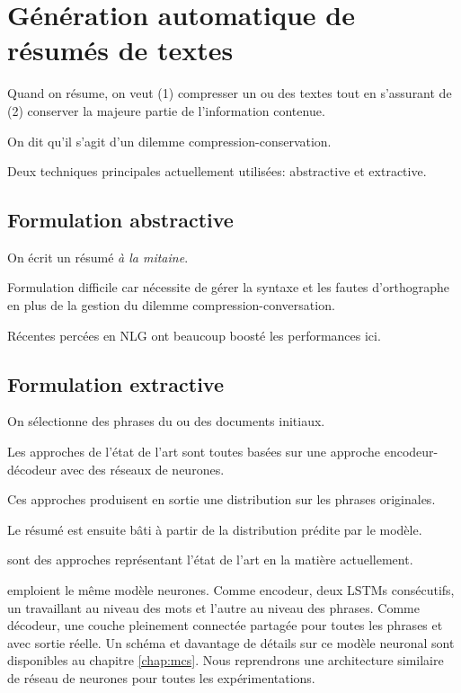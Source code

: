 \chapter{Génération automatique de résumés de textes}     %
\label{chap:generation_resumes}                           %

Quand on résume, on veut (1) compresser un ou des textes tout en
s'assurant de (2) conserver la majeure partie de l'information contenue.

On dit qu'il s'agit d'un dilemme compression-conservation.

Deux techniques principales actuellement utilisées: abstractive et extractive.

\section{Formulation abstractive}

On écrit un résumé \textit{à la mitaine}.

Formulation difficile car nécessite de gérer la syntaxe et les fautes
d'orthographe en plus de la gestion du dilemme compression-conversation.

Récentes percées en NLG ont beaucoup boosté les performances ici.

\citep{2020t5, unilm, zhang2019pegasus}

\section{Formulation extractive}

On sélectionne des phrases du ou des documents initiaux.

Les approches de l'état de l'art sont toutes basées sur une approche
encodeur-décodeur avec des réseaux de neurones.

Ces approches produisent en sortie une distribution sur les phrases
originales.

Le résumé est ensuite bâti à partir de la distribution prédite par le modèle.

\citep{dong2018banditsum,luo-etal-2019-reading,zhong-etal-2020-extractive}
sont des approches représentant l'état de l'art en la matière actuellement.

\citep{dong2018banditsum,luo-etal-2019-reading} emploient le
même modèle neurones.
Comme encodeur, deux LSTMs consécutifs, un travaillant au niveau
des mots et l'autre au niveau des phrases.
Comme décodeur, une couche pleinement connectée partagée pour toutes les
phrases et avec sortie réelle.
Un schéma et davantage de détails sur ce modèle neuronal sont disponibles
au chapitre \ref{chap:mcs}.
Nous reprendrons une architecture similaire de réseau de neurones pour toutes
les expérimentations.

